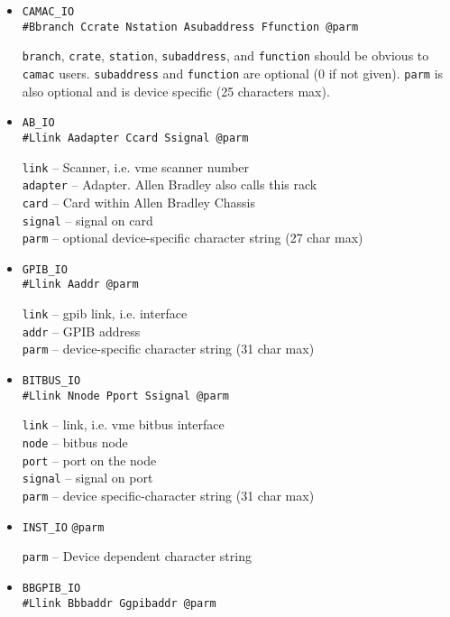 \begin{description}
\begin{itemize}
\begin{itemize}
\item \verb|CAMAC_IO| \\
\verb|#Bbranch Ccrate Nstation Asubaddress Ffunction @parm|

\verb|branch|, \verb|crate|, \verb|station|, \verb|subaddress|, and \verb|function| should be obvious to \verb|camac| users.
\verb|subaddress| and \verb|function| are optional (0 if not given).
\verb|parm| is also optional and is device specific (25 characters max).

\item \verb|AB_IO| \\
\verb|#Llink Aadapter Ccard Ssignal @parm|

\verb|link| -- Scanner, i.e. vme scanner number \\
\verb|adapter| -- Adapter. Allen Bradley also calls this rack \\
\verb|card| -- Card within Allen Bradley Chassis \\
\verb|signal| -- signal on card \\
\verb|parm| -- optional device-specific character string (27 char max)

\item \verb|GPIB_IO| \\
\verb|#Llink Aaddr @parm|

\verb|link| -- gpib link, i.e. interface \\
\verb|addr| -- GPIB address \\
\verb|parm| -- device-specific character string (31 char max)

\item \verb|BITBUS_IO| \\
\verb|#Llink Nnode Pport Ssignal @parm|

\verb|link| -- link, i.e.  vme bitbus interface \\
\verb|node| -- bitbus node \\
\verb|port| -- port on the node \\
\verb|signal| -- signal on port \\
\verb|parm| -- device specific-character string (31 char max)

\item \verb|INST_IO|
\verb|@parm|

\verb|parm| -- Device dependent character string

\item \verb|BBGPIB_IO| \\
\verb|#Llink Bbbaddr Ggpibaddr @parm|


\end{itemize}
\end{itemize}
\end{description}
